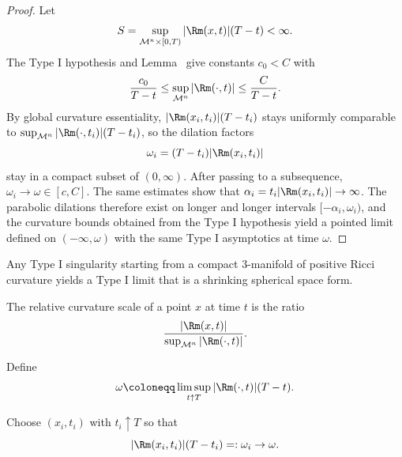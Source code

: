 \begin{proof}
\sketch Let
\[
S=\sup_{\mathcal M^n\times[0,T)}|\Rm(x,t)|(T-t)<\infty.
\]
The Type I hypothesis and Lemma~ give constants \(c_0<C\) with
\[
\frac{c_0}{T-t}\le \sup_{\mathcal M^n}|\Rm(\cdot,t)|\le \frac{C}{T-t}.
\]
By global curvature essentiality, \(|\Rm(x_i,t_i)|(T-t_i)\) stays uniformly comparable to \(\sup_{\mathcal M^n}|\Rm(\cdot,t_i)|(T-t_i)\), so the dilation factors
\[
\omega_i=(T-t_i)|\Rm(x_i,t_i)|
\]
stay in a compact subset of \((0,\infty)\). After passing to a subsequence, \(\omega_i\to\omega\in[c,C]\). The same estimates show that \(\alpha_i=t_i|\Rm(x_i,t_i)|\to\infty\). The parabolic dilations therefore exist on longer and longer intervals \([-\alpha_i,\omega_i)\), and the curvature bounds obtained from the Type I hypothesis yield a pointed limit defined on \((-\infty,\omega)\) with the same Type I asymptotics at time \(\omega\).
\end{proof}

\begin{remark}
\label{ch08-rem-shrinking-spherical-space-forms}
Any Type I singularity starting from a compact \(3\)-manifold of positive Ricci curvature yields a Type I limit that is a shrinking spherical space form.
\end{remark}

\begin{remark}
\label{ch08-rem-relative-curvature-scale}
The relative curvature scale of a point \(x\) at time \(t\) is the ratio
\[
\frac{|\Rm(x,t)|}{\sup_{\mathcal M^n}|\Rm(\cdot,t)|}.
\]
\end{remark}

\begin{definition}
\label{ch08-def-type-i-limsup-scale}
Define
\[
\omega\coloneqq \limsup_{t\uparrow T}|\Rm(\cdot,t)|(T-t).
\]
\end{definition}

\begin{definition}
\label{ch08-def-type-i-rescaling-factors}
Choose \((x_i,t_i)\) with \(t_i\uparrow T\) so that
\[
|\Rm(x_i,t_i)|(T-t_i)=:\omega_i\to\omega.
\]
\end{definition}

